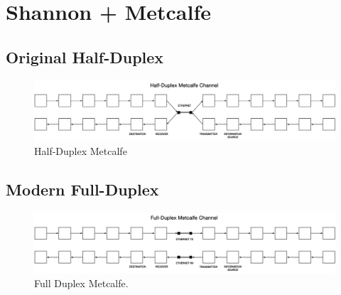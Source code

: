 \documentclass[HFT-main.tex]{subfiles}
\begin{document}
\section{Shannon +  Metcalfe}

 \subsection{Original Half-Duplex}
 
 
 
\begin{figure}[ht]
  \centering
  \includegraphics[width=0.9\linewidth]{../figures/Half-Duplex-Metcalfe.png}
  \caption{Half-Duplex Metcalfe}
\end{figure}
 
  \subsection{Modern Full-Duplex}
 
\begin{figure}[ht]
  \centering
  \includegraphics[width=0.9\linewidth]{../figures/Full-Duplex-Metcalfe.png}
  \caption{Full Duplex Metcalfe.}
\end{figure}



%
%
%
\end{document}
